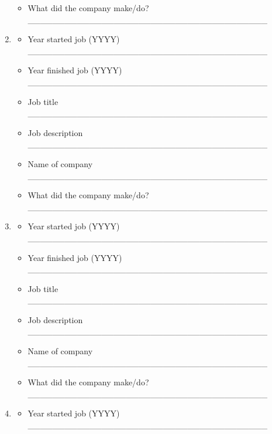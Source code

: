 \documentclass[a4paper,10pt]{article}
\begin{document}
\begin{enumerate}
\begin{itemize}
         \item What did the company make/do? \_\_\_\_\_\_\_\_\_\_\_\_\_\_\_\_\_\_\_\_\_\_\_\_\_\_\_\_\_\_\_\_\_\_\_\_\_\_\_
      \end{itemize}
 \item
     \begin{itemize}
         \item Year started job (YYYY) \_\_\_\_\_\_\_\_\_\_\_\_\_\_\_\_\_\_\_\_\_\_\_\_\_\_\_\_\_\_\_\_\_\_\_\_\_\_\_ 
         \item Year finished job (YYYY) \_\_\_\_\_\_\_\_\_\_\_\_\_\_\_\_\_\_\_\_\_\_\_\_\_\_\_\_\_\_\_\_\_\_\_\_\_\_\_
         \item Job title \_\_\_\_\_\_\_\_\_\_\_\_\_\_\_\_\_\_\_\_\_\_\_\_\_\_\_\_\_\_\_\_\_\_\_\_\_\_\_
         \item Job description \_\_\_\_\_\_\_\_\_\_\_\_\_\_\_\_\_\_\_\_\_\_\_\_\_\_\_\_\_\_\_\_\_\_\_\_\_\_\_
         \item Name of company \_\_\_\_\_\_\_\_\_\_\_\_\_\_\_\_\_\_\_\_\_\_\_\_\_\_\_\_\_\_\_\_\_\_\_\_\_\_\_
         \item What did the company make/do? \_\_\_\_\_\_\_\_\_\_\_\_\_\_\_\_\_\_\_\_\_\_\_\_\_\_\_\_\_\_\_\_\_\_\_\_\_\_\_
      \end{itemize}
 \item
     \begin{itemize}
         \item Year started job (YYYY) \_\_\_\_\_\_\_\_\_\_\_\_\_\_\_\_\_\_\_\_\_\_\_\_\_\_\_\_\_\_\_\_\_\_\_\_\_\_\_ 
         \item Year finished job (YYYY) \_\_\_\_\_\_\_\_\_\_\_\_\_\_\_\_\_\_\_\_\_\_\_\_\_\_\_\_\_\_\_\_\_\_\_\_\_\_\_
         \item Job title \_\_\_\_\_\_\_\_\_\_\_\_\_\_\_\_\_\_\_\_\_\_\_\_\_\_\_\_\_\_\_\_\_\_\_\_\_\_\_
         \item Job description \_\_\_\_\_\_\_\_\_\_\_\_\_\_\_\_\_\_\_\_\_\_\_\_\_\_\_\_\_\_\_\_\_\_\_\_\_\_\_
         \item Name of company \_\_\_\_\_\_\_\_\_\_\_\_\_\_\_\_\_\_\_\_\_\_\_\_\_\_\_\_\_\_\_\_\_\_\_\_\_\_\_
         \item What did the company make/do? \_\_\_\_\_\_\_\_\_\_\_\_\_\_\_\_\_\_\_\_\_\_\_\_\_\_\_\_\_\_\_\_\_\_\_\_\_\_\_
      \end{itemize}
 \item
     \begin{itemize}
         \item Year started job (YYYY) \_\_\_\_\_\_\_\_\_\_\_\_\_\_\_\_\_\_\_\_\_\_\_\_\_\_\_\_\_\_\_\_\_\_\_\_\_\_\_ 

\end{itemize}
\end{enumerate}
\end{document}
